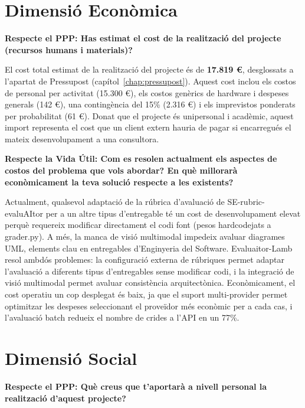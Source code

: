 \documentclass[12pt,a4paper,twoside]{report}
\begin{document}
\section{Dimensi\'o Econ\`omica}
\label{sec:dimensio-economica}

\textbf{Respecte el PPP: Has estimat el cost de la realitzaci\'o del projecte (recursos humans i materials)?}

El cost total estimat de la realitzaci\'o del projecte \'es de \textbf{17.819 \euro}, desglossats a l'apartat de Pressupost (cap\'itol~\ref{chap:pressupost}). Aquest cost inclou els costos de personal per activitat (15.300 \euro), els costos gen\`erics de hardware i despeses generals (142 \euro), una conting\`encia del 15\% (2.316 \euro) i els imprevistos ponderats per probabilitat (61 \euro). Donat que el projecte \'es unipersonal i acad\`emic, aquest import representa el cost que un client extern hauria de pagar si encarregu\'es el mateix desenvolupament a una consultora.

\textbf{Respecte la Vida \'Util: Com es resolen actualment els aspectes de costos del problema que vols abordar? En qu\`e millorar\`a econ\`omicament la teva soluci\'o respecte a les existents?}

Actualment, qualsevol adaptaci\'o de la r\'ubrica d'avaluaci\'o de SE-rubric-evaluAItor per a un altre tipus d'entregable t\'e un cost de desenvolupament elevat perqu\`e requereix modificar directament el codi font (pesos hardcodejats a grader.py). A m\'es, la manca de visi\'o multimodal impedeix avaluar diagrames UML, elements clau en entregables d'Enginyeria del Software. Evaluaitor-Lamb resol ambd\'os problemes: la configuraci\'o externa de r\'ubriques permet adaptar l'avaluaci\'o a diferents tipus d'entregables sense modificar codi, i la integraci\'o de visi\'o multimodal permet avaluar consist\`encia arquitect\`onica. Econ\`omicament, el cost operatiu un cop desplegat \'es baix, ja que el suport multi-provider permet optimitzar les despeses seleccionant el prove\"idor m\'es econ\`omic per a cada cas, i l'avaluaci\'o batch redueix el nombre de crides a l'API en un 77\%.

\section{Dimensi\'o Social}
\label{sec:dimensio-social}

\textbf{Respecte el PPP: Qu\`e creus que t'aportar\`a a nivell personal la realitzaci\'o d'aquest projecte?}
\end{document}
